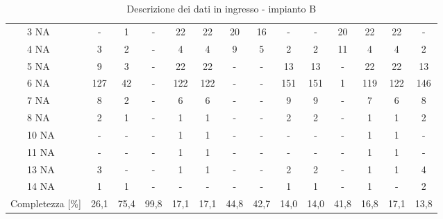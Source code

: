 \begin{sidewaystable}
\begin{center}
\begin{tabular}{|ll|c|c|c|c|c|c|c|c|c|c|c|c|c|}
		& 3 NA       & -    & 1    & -     & 22    & 22    & 20   & 16   & -      & -      & 20   & 22    & 22    & -       \\ \cline{3-15} 
		& 4 NA       & 3    & 2    & -     & 4     & 4     & 9    & 5    & 2      & 2      & 11   & 4     & 4     & 2       \\ \cline{3-15} 
		& 5 NA       & 9    & 3    & -     & 22    & 22    & -    & -    & 13     & 13     & -    & 22    & 22    & 13      \\ \cline{3-15} 
		& 6 NA       & 127  & 42   & -     & 122   & 122   & -    & -    & 151    & 151    & 1    & 119   & 122   & 146     \\ \cline{3-15} 
		& 7 NA       & 8    & 2    & -     & 6     & 6     & -    & -    & 9      & 9      & -    & 7     & 6     & 8       \\ \cline{3-15} 
		& 8 NA       & 2    & 1    & -     & 1     & 1     & -    & -    & 2      & 2      & -    & 1     & 1     & 2       \\ \cline{3-15} 
		& 10 NA      & -    & -    & -     & 1     & 1     & -    & -    & -      & -      & -    & 1     & 1     & -       \\ \cline{3-15} 
		& 11 NA      & -    & -    & -     & 1     & 1     & -    & -    & -      & -      & -    & 1     & 1     & -       \\ \cline{3-15} 
		& 13 NA      & 3    & -    & -     & 1     & 1     & -    & -    & 2      & 2      & -    & 1     & 1     & 4       \\ \cline{3-15} 
		& 14 NA      & 1    & 1    & -     & -     & -     & -    & -    & 1      & 1      & -    & 1     & -     & 2        \\ \hline
		\multicolumn{2}{|l|}{Completezza {[}\%{]}}       & 26,1 & 75,4 & 99,8  & 17,1  & 17,1  & 44,8 & 42,7 & 14,0   & 14,0   & 41,8 & 16,8  & 17,1  & 13,8    \\ \hline
	\end{tabular}
	\caption{Descrizione dei dati in ingresso - impianto B}
	\label{tab:c_NAin}
\end{center}
\end{sidewaystable}


